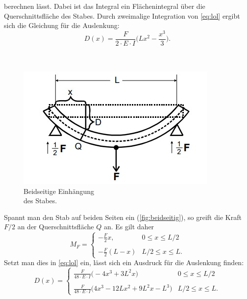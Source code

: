 berechnen lässt. Dabei ist das Integral ein Flächenintegral über die Querschnittsfläche des Stabes.
Durch zweimalige Integration von \autoref{eq:lol} ergibt sich die Gleichung für die Auslenkung:
\begin{equation}\label{eq:ausgleich}
    D(x) = \frac{F}{2 \cdot E \cdot I} \biggl(Lx^2 - \frac{x^3}{3}\biggr).
\end{equation}
\\
\\
\begin{minipage}[4cm]{0.45\textwidth}
    \begin{figure}[H]
        \includegraphics[width=\linewidth]{img/abb4.jpg}
        \caption{Beidseitige Einhängung \\des Stabes.\cite{V103}}
        \label{fig:beidseitig}
    \end{figure}
    \vspace{10pt}
    \end{minipage}
    \begin{minipage}[4cm]{0.55\textwidth}
        Spannt man den Stab auf beiden Seiten ein (\autoref{fig:beidseitig}), so greift die Kraft $F/2$ an der Querschnittsfläche $Q$ an.
        Es gilt daher
        \begin{equation*}
            M_F = 
            \begin{cases}
                -\frac{F}{2}x, & 0 \leq x \leq L/2 \\
                \\
                -\frac{F}{2}(L-x) & L/2 \leq x \leq L.
            \end{cases}
        \end{equation*}
        Setzt man dies in \autoref{eq:lol} ein, lässt sich ein Ausdruck für die Auslenkung finden:
        \begin{equation}\label{eq:auslenkung}
            D(x) = 
            \begin{cases}
                \frac{F}{48 \cdot E \cdot I} \biggl(-4x^3 + 3L^2x\biggr) & 0 \leq x \leq L/2 \\
                \\
                \frac{F}{48 \cdot E \cdot I} \biggl(4x^3 - 12Lx^2 + 9L^2x - L^3\biggr) & L/2 \leq x \leq L.
            \end{cases}
        \end{equation}
        \vspace{10pt}
    \end{minipage}
    \newpage